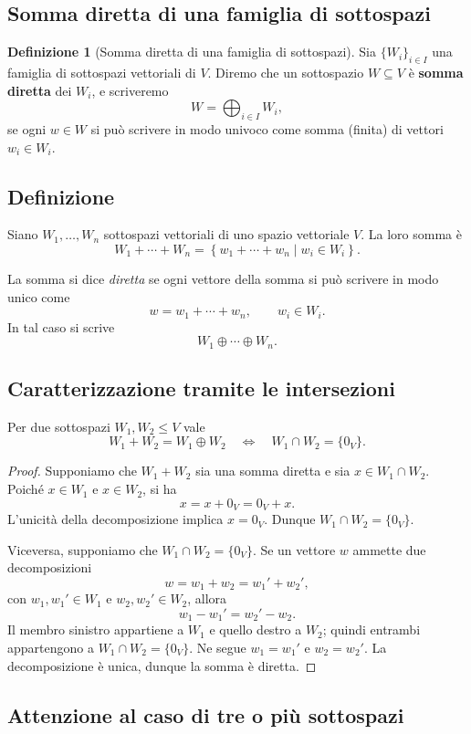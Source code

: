 \documentclass[11pt,a4paper]{article}
\theoremstyle{plain}
\theoremstyle{definition}
\newtheorem{defn}[prop]{Definizione}
\theoremstyle{remark}
\begin{document}
\subsection{Somma diretta di una famiglia di sottospazi}

\begin{defn}[Somma diretta di una famiglia di sottospazi]
    Sia $\{W_i\}_{i\in I}$ una famiglia di sottospazi vettoriali di $V$. Diremo che un sottospazio $W\subseteq V$ è \textbf{somma diretta} dei $W_i$, e scriveremo
    \[
        W = \bigoplus_{i\in I}W_i,
    \]
    se ogni $w \in W$ si può scrivere in modo univoco come somma (finita) di vettori $w_i \in W_i$.
\end{defn}
\subsection{Definizione}

Siano $W_1,\ldots,W_n$ sottospazi vettoriali di uno spazio vettoriale $V$. La loro somma è
\[
W_1+\cdots+W_n
=
\left\{w_1+\cdots+w_n \mid w_i\in W_i\right\}.
\]

La somma si dice \emph{diretta} se ogni vettore della somma si può scrivere in modo unico come
\[
w=w_1+\cdots+w_n,
\qquad w_i\in W_i.
\]
In tal caso si scrive
\[
W_1\oplus\cdots\oplus W_n.
\]

\subsection{Caratterizzazione tramite le intersezioni}

Per due sottospazi $W_1,W_2\leq V$ vale
\[
W_1+W_2=W_1\oplus W_2
\quad\Longleftrightarrow\quad
W_1\cap W_2=\{0_V\}.
\]

\begin{proof}
Supponiamo che $W_1+W_2$ sia una somma diretta e sia $x\in W_1\cap W_2$.
Poiché $x\in W_1$ e $x\in W_2$, si ha
\[
x=x+0_V=0_V+x.
\]
L'unicità della decomposizione implica $x=0_V$. Dunque
$W_1\cap W_2=\{0_V\}$.

Viceversa, supponiamo che $W_1\cap W_2=\{0_V\}$. Se un vettore $w$ ammette due decomposizioni
\[
w=w_1+w_2=w_1'+w_2',
\]
con $w_1,w_1'\in W_1$ e $w_2,w_2'\in W_2$, allora
\[
w_1-w_1'=w_2'-w_2.
\]
Il membro sinistro appartiene a $W_1$ e quello destro a $W_2$; quindi entrambi appartengono a $W_1\cap W_2=\{0_V\}$. Ne segue
$w_1=w_1'$ e $w_2=w_2'$. La decomposizione è unica, dunque la somma è diretta.
\end{proof}

\subsection{Attenzione al caso di tre o più sottospazi}
\end{document}

